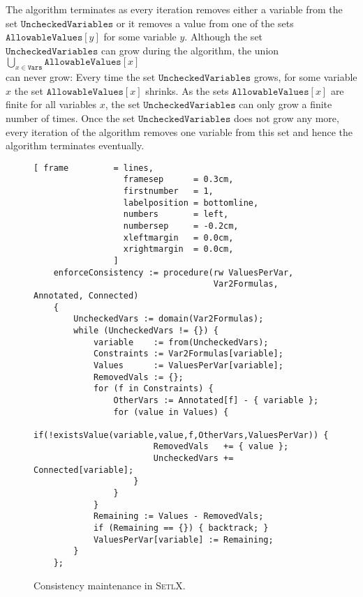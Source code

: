 The algorithm terminates as every iteration removes either a variable from the set
$\texttt{UncheckedVariables}$ or it removes a value from one of the sets $\texttt{AllowableValues}[y]$ for some
variable $y$.  Although the set $\texttt{UncheckedVariables}$ can grow during the algorithm,  the union
\\[0.2cm]
\hspace*{1.3cm}
$\bigcup\limits_{x \in \mathtt{Vars}} \texttt{AllowableValues}[x]$ 
\\[0.2cm]
can never grow:  Every time the set $\texttt{UncheckedVariables}$ grows,
for some variable $x$ the set $\texttt{AllowableValues}[x]$ shrinks.
As the sets $\texttt{AllowableValues}[x]$ are finite for all variables $x$, the set
$\texttt{UncheckedVariables}$ can only grow a finite number of times. 
Once the set $\texttt{UncheckedVariables}$ does not grow any more, every iteration of the algorithm removes one
variable from this set and hence the algorithm terminates eventually.

\begin{figure}[!ht]
\centering
\begin{Verbatim}[ frame         = lines, 
                  framesep      = 0.3cm, 
                  firstnumber   = 1,
                  labelposition = bottomline,
                  numbers       = left,
                  numbersep     = -0.2cm,
                  xleftmargin   = 0.0cm,
                  xrightmargin  = 0.0cm,
                ]
    enforceConsistency := procedure(rw ValuesPerVar,
                                    Var2Formulas, Annotated, Connected)
    {
        UncheckedVars := domain(Var2Formulas);
        while (UncheckedVars != {}) {
            variable    := from(UncheckedVars);
            Constraints := Var2Formulas[variable];
            Values      := ValuesPerVar[variable];
            RemovedVals := {};
            for (f in Constraints) {
                OtherVars := Annotated[f] - { variable };
                for (value in Values) {
                    if(!existsValue(variable,value,f,OtherVars,ValuesPerVar)) {
                        RemovedVals   += { value };
                        UncheckedVars += Connected[variable];
                    }
                }
            }
            Remaining := Values - RemovedVals;
            if (Remaining == {}) { backtrack; }
            ValuesPerVar[variable] := Remaining;
        }
    };
\end{Verbatim}
\vspace*{-0.3cm}
\caption{Consistency maintenance in \textsc{SetlX}.}
\label{fig:csp-consistency.stlx:enforceConsistency}
\end{figure}

